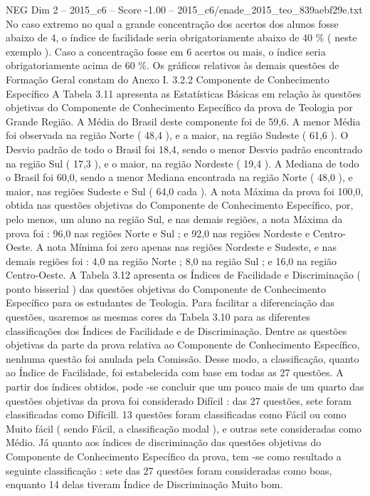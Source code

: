 \begin{textsample}{NEG Dim 2 – 2015\_c6 – Score -1.00 – 2015\_c6/enade\_2015\_teo\_839aebf29e.txt}
No caso extremo no qual a grande concentração dos acertos dos alunos fosse abaixo de 4, o índice de facilidade seria obrigatoriamente abaixo de 40 \% ( neste exemplo ).
Caso a concentração fosse em 6 acertos ou mais, o índice seria obrigatoriamente acima de 60 \%.
Os gráficos relativos às demais questões de Formação Geral constam do Anexo I. 3.2.2 Componente de Conhecimento Específico A Tabela 3.11 apresenta as Estatísticas Básicas em relação às questões objetivas do Componente de Conhecimento Específico da prova de Teologia por Grande Região.
A Média do Brasil deste componente foi de 59,6.
A menor Média foi observada na região Norte ( 48,4 ), e a maior, na região Sudeste ( 61,6 ).
O Desvio padrão de todo o Brasil foi 18,4, sendo o menor Desvio padrão encontrado na região Sul ( 17,3 ), e o maior, na região Nordeste ( 19,4 ).
A Mediana de todo o Brasil foi 60,0, sendo a menor Mediana encontrada na região Norte ( 48,0 ), e maior, nas regiões Sudeste e Sul ( 64,0 cada ).
A nota Máxima da prova foi 100,0, obtida nas questões objetivas do Componente de Conhecimento Específico, por, pelo menos, um aluno na região Sul, e nas demais regiões, a nota Máxima da prova foi : 96,0 nas regiões Norte e Sul ; e 92,0 nas regiões Nordeste e Centro-Oeste.
A nota Mínima foi zero apenas nas regiões Nordeste e Sudeste, e nas demais regiões foi : 4,0 na região Norte ; 8,0 na região Sul ; e 16,0 na região Centro-Oeste.
A Tabela 3.12 apresenta os Índices de Facilidade e Discriminação ( ponto bisserial ) das questões objetivas do Componente de Conhecimento Específico para os estudantes de Teologia.
Para facilitar a diferenciação das questões, usaremos as mesmas cores da Tabela 3.10 para as diferentes classificações dos Índices de Facilidade e de Discriminação.
Dentre as questões objetivas da parte da prova relativa ao Componente de Conhecimento Específico, nenhuma questão foi anulada pela Comissão.
Desse modo, a classificação, quanto ao Índice de Facilidade, foi estabelecida com base em todas as 27 questões.
A partir dos índices obtidos, pode -se concluir que um pouco mais de um quarto das questões objetivas da prova foi considerado Difícil : das 27 questões, sete foram classificadas como Difícill. 13 questões foram classificadas como Fácil ou como Muito fácil ( sendo Fácil, a classificação modal ), e outras sete consideradas como Médio.
Já quanto aos índices de discriminação das questões objetivas do Componente de Conhecimento Específico da prova, tem -se como resultado a seguinte classificação : sete das 27 questões foram consideradas como boas, enquanto 14 delas tiveram Índice de Discriminação Muito bom.

\end{textsample}
